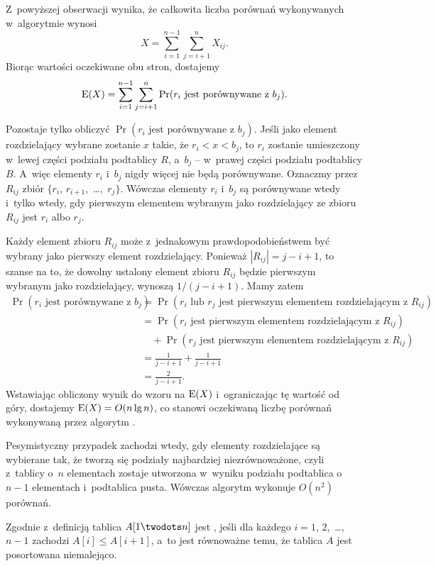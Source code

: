 Z~powyższej obserwacji wynika, że całkowita liczba porównań wykonywanych w~algorytmie wynosi
\[
    X = \sum_{i=1}^{n-1}\sum_{j=i+1}^nX_{ij}.
\]
Biorąc wartości oczekiwane obu stron, dostajemy
\[
    \operatorname{E}(X) = \sum_{i=1}^{n-1}\sum_{j=i+1}^n\Pr(\text{$r_i$ jest porównywane z~$b_j$}).
\]

Pozostaje tylko obliczyć $\Pr(\text{$r_i$ jest porównywane z~$b_j$})$. Jeśli jako element rozdzielający wybrane zostanie $x$ takie, że $r_i<x<b_j$, to $r_i$ zostanie umieszczony w~lewej części podziału podtablicy $R$, a~$b_j$ -- w~prawej części podziału podtablicy $B$. A~więc elementy $r_i$ i~$b_j$ nigdy więcej nie będą porównywane. Oznaczmy przez $R_{ij}$ zbiór $\{r_i$, $r_{i+1}$,~\dots,~$r_j\}$. Wówczas elementy $r_i$ i~$b_j$ są porównywane wtedy i~tylko wtedy, gdy pierwszym elementem wybranym jako rozdzielający ze zbioru $R_{ij}$ jest $r_i$ albo $r_j$.

Każdy element zbioru $R_{ij}$ może z~jednakowym prawdopodobieństwem być wybrany jako pierwszy element rozdzielający. Ponieważ $|R_{ij}|=j-i+1$, to szanse na to, że dowolny ustalony element zbioru $R_{ij}$ będzie pierwszym wybranym jako rozdzielający, wynoszą $1/(j-i+1)$. Mamy zatem
\begin{align*}
    \Pr(\text{$r_i$ jest porównywane z~$b_j$}) &= \Pr(\text{$r_i$ lub $r_j$ jest pierwszym elementem rozdzielającym z~$R_{ij}$}) \\
	&= \Pr(\text{$r_i$ jest pierwszym elementem rozdzielającym z~$R_{ij}$}) \\
	&\quad {}+\Pr(\text{$r_j$ jest pierwszym elementem rozdzielającym z~$R_{ij}$}) \\
	&= \frac{1}{j-i+1}+\frac{1}{j-i+1} \\
	&= \frac{2}{j-i+1}.
\end{align*}
Wstawiając obliczony wynik do wzoru na $\operatorname{E}(X)$ i~ograniczając tę wartość od góry, dostajemy $\operatorname{E}(X)=O(n\lg n)$, co stanowi oczekiwaną liczbę porównań wykonywaną przez algorytm .

Pesymistyczny przypadek zachodzi wtedy, gdy elementy rozdzielające są wybierane tak, że tworzą się podziały najbardziej niezrównoważone, czyli z~tablicy o~$n$ elementach zostaje utworzona w~wyniku podziału podtablica o~$n-1$ elementach i~podtablica pusta. Wówczas algorytm wykonuje $O(n^2)$ porównań.


\subproblem %
Zgodnie z~definicją tablica $A[1\twodots n]$ jest , jeśli dla każdego $i=1$, 2,~\dots,~$n-1$ zachodzi $A[i]\le A[i+1]$, a~to jest równoważne temu, że tablica $A$ jest posortowana niemalejąco.

